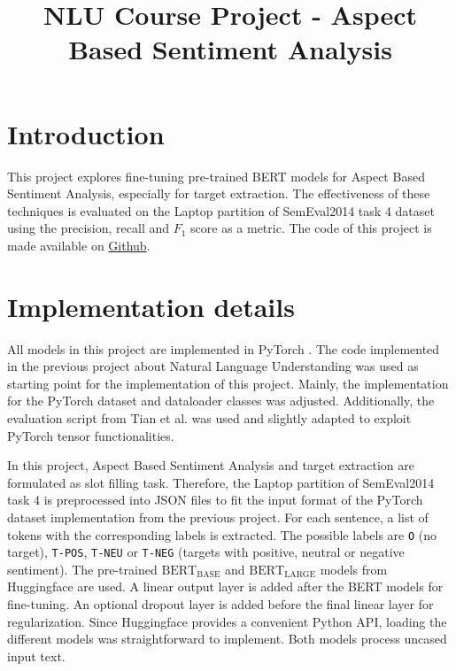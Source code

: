 \documentclass[a4paper]{article}
\title{NLU Course Project - Aspect Based Sentiment Analysis}
\begin{document}
\maketitle


\section{Introduction}
This project explores fine-tuning pre-trained BERT models for Aspect Based Sentiment Analysis, especially for target extraction. The effectiveness of these techniques is evaluated on the Laptop partition of SemEval2014 task 4 dataset using the precision, recall and $F_1$ score as a metric. The code of this project is made available on \href{https://github.com/chrisdalvit/nlu-assignment}{Github}.

\section{Implementation details}
\label{sec:implementation}
All models in this project are implemented in PyTorch \cite{paszke2019pytorchimperativestylehighperformance}. The code implemented in the previous project about Natural Language Understanding was used as starting point for the implementation of this project. Mainly, the implementation for the PyTorch dataset and dataloader classes was adjusted. Additionally, the evaluation script from Tian et al. \cite{tian-etal-2023-end} was used and slightly adapted to exploit PyTorch tensor functionalities. 

In this project, Aspect Based Sentiment Analysis and target extraction are formulated as slot filling task. Therefore, the Laptop partition of SemEval2014 task 4 is preprocessed into JSON files to fit the input format of the PyTorch dataset implementation from the previous project. For each sentence, a list of tokens with the corresponding labels is extracted. The possible labels are \texttt{O} (no target), \texttt{T-POS}, \texttt{T-NEU} or \texttt{T-NEG} (targets with positive, neutral or negative sentiment). The pre-trained $\text{BERT}_{\text{BASE}}$ and $\text{BERT}_{\text{LARGE}}$ models \cite{devlin2019bertpretrainingdeepbidirectional} from Huggingface are used. A linear output layer is added after the BERT models for fine-tuning. An optional dropout layer is added before the final linear layer for regularization. Since Huggingface provides a convenient Python API, loading the different models was straightforward to implement. Both models process uncased input text. 
\end{document}
